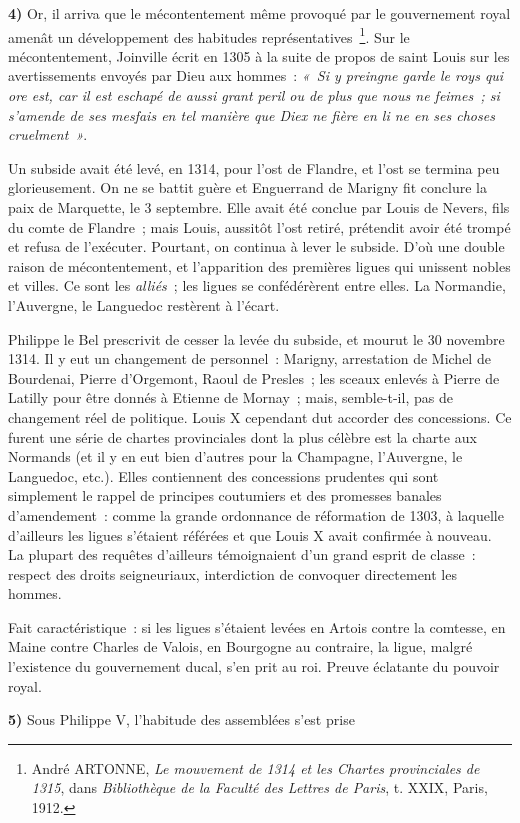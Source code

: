 \documentclass[french,twoside]{book} %
\newcommand{\labelchar}[1]{\textbf{\color{rubric} #1}}
\begin{document}
\bigbreak
\noindent \labelchar{4)} Or, il arriva que le mécontentement même provoqué par le gouvernement royal amenât un développement des habitudes représentatives \footnote{ André ARTONNE, {\itshape Le mouvement de 1314 et les Chartes provinciales de 1315}, dans {\itshape Bibliothèque de la Faculté des Lettres de Paris}, t. XXIX, Paris, 1912.}. Sur le mécontentement, Joinville écrit en 1305 à la suite de propos de saint Louis sur les avertissements envoyés par Dieu aux hommes : \emph{« Si y preingne garde le roys qui ore est, car il est eschapé de aussi grant peril ou de plus que nous ne feimes ; si s’amende de ses mesfais en tel manière que Diex ne fière en li ne en ses choses cruelment »}.\par
Un subside avait été levé, en 1314, pour l’ost de Flandre, et l’ost se termina peu glorieusement. On ne se battit guère et Enguerrand de Marigny fit conclure la paix de Marquette, le 3 septembre. Elle avait été conclue par Louis de Nevers, fils du comte de Flandre ; mais Louis, aussitôt l’ost retiré, prétendit avoir été trompé et refusa de l’exécuter. Pourtant, on continua à lever le subside. D’où une double raison de mécontentement, et l’apparition des premières ligues qui unissent nobles et villes. Ce sont les \emph{alliés} ; les ligues se confédérèrent entre elles. La Normandie, l’Auvergne, le Languedoc restèrent à l’écart.\par
\label{p47} Philippe le Bel prescrivit de cesser la levée du subside, et mourut le 30 novembre 1314. Il y eut un changement de personnel : Marigny, arrestation de Michel de Bourdenai, Pierre d’Orgemont, Raoul de Presles ; les sceaux enlevés à Pierre de Latilly pour être donnés à Etienne de Mornay ; mais, semble-t-il, pas de changement réel de politique. Louis X cependant dut accorder des concessions. Ce furent une série de chartes provinciales dont la plus célèbre est la charte aux Normands (et il y en eut bien d’autres pour la Champagne, l’Auvergne, le Languedoc, etc.). Elles contiennent des concessions prudentes qui sont simplement le rappel de principes coutumiers et des promesses banales d’amendement : comme la grande ordonnance de réformation de 1303, à laquelle d’ailleurs les ligues s’étaient référées et que Louis X avait confirmée à nouveau. La plupart des requêtes d’ailleurs témoignaient d’un grand esprit de classe : respect des droits seigneuriaux, interdiction de convoquer directement les hommes.\par
Fait caractéristique : si les ligues s’étaient levées en Artois contre la comtesse, en Maine contre Charles de Valois, en Bourgogne au contraire, la ligue, malgré l’existence du gouvernement ducal, s’en prit au roi. Preuve éclatante du pouvoir royal.\par
\bigbreak
\noindent \labelchar{5)} Sous Philippe V, l’habitude des assemblées s’est prise\par
\end{document}
